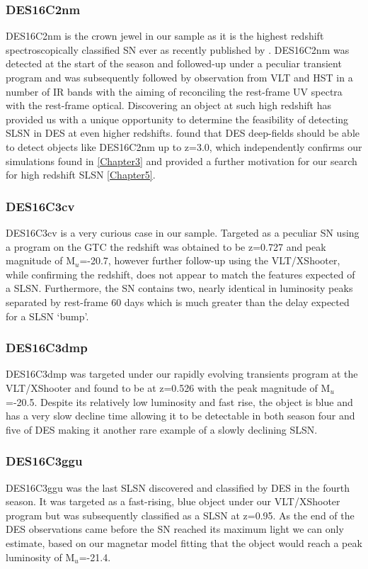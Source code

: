 \subsubsection{DES16C2nm}
DES16C2nm is the crown jewel in our sample as it is the highest redshift spectroscopically classified SN ever as recently published by \citet{Smith2018}. DES16C2nm was detected at the start of the season and followed-up under a peculiar transient program and was subsequently followed by observation from VLT and HST in a number of IR bands with the aiming of reconciling the rest-frame UV spectra with the rest-frame optical. Discovering an object at such high redshift has provided us with a unique opportunity to determine the feasibility of detecting SLSN in DES at even higher redshifts. \citet{Smith2018} found that DES deep-fields should be able to detect objects like DES16C2nm up to z=3.0, which independently confirms our simulations found in \cref{Chapter3} and provided a further motivation for our search for high redshift SLSN \cref{Chapter5}.

\subsubsection{DES16C3cv}
DES16C3cv is a very curious case in our sample. Targeted as a peculiar SN using a program on the GTC the redshift was obtained to be z=0.727 and peak magnitude of M$_u$=-20.7, however further follow-up using the VLT/XShooter, while confirming the redshift, does not appear to match the features expected of a SLSN. Furthermore, the SN contains two, nearly identical in luminosity peaks separated by rest-frame 60 days which is much greater than the delay expected for a SLSN `bump'.

\subsubsection{DES16C3dmp}
DES16C3dmp was targeted under our rapidly evolving transients program at the VLT/XShooter and found to be at z=0.526 with the peak magnitude of M$_u$=-20.5. Despite its relatively low luminosity and fast rise, the object is blue and has a very slow decline time allowing it to be detectable in both season four and five of DES making it another rare example of a slowly declining SLSN.

\subsubsection{DES16C3ggu}
DES16C3ggu was the last SLSN discovered and classified by DES in the fourth season. It was targeted as a fast-rising, blue object under our VLT/XShooter program but was subsequently classified as a SLSN at z=0.95. As the end of the DES observations came before the SN reached its maximum light we can only estimate, based on our magnetar model fitting that the object would reach a peak luminosity of M$_u$=-21.4.

